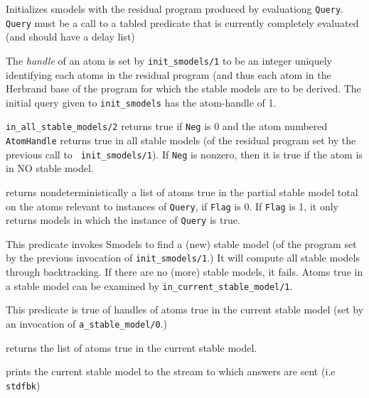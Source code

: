 \begin{description}
%
Initializes smodels with the residual program produced by evaluationg
{\tt Query}.  {\tt Query} must be a call to a tabled predicate that is
currently completely evaluated (and should have a delay list)

% 
The {\em handle} of an atom is set by {\tt init\_smodels/1} to be an
integer uniquely identifying each atoms in the residual program (and
thus each atom in the Herbrand base of the program for which the
stable models are to be derived.  The initial query given to
{\tt init\_smodels} has the atom-handle of 1.

%
{\tt in\_all\_stable\_models/2} returns true if {\tt Neg} is 0 and the
atom numbered {\tt AtomHandle} returns true in all stable models (of
the residual program set by the previous call to {\tt
  init\_smodels/1}).  If {\tt Neg} is nonzero, then it is true if the
atom is in NO stable model.

%
returns nondeterministically a list of atoms true in the partial
stable model total on the atoms relevant to instances of {\tt Query},
if {\tt Flag} is 0.  If {\tt Flag} is 1, it only returns models in
which the instance of {\tt Query} is true.

%
This predicate invokes Smodels to find a (new) stable model (of the
program set by the previous invocation of {\tt init\_smodels/1}.)  It
will compute all stable models through backtracking.  If there are no
(more) stable models, it fails.  Atoms true in a stable model can be
examined by {\tt in\_current\_stable\_model/1}.

%
This predicate is true of handles of atoms true in the current stable
model (set by an invocation of {\tt a\_stable\_model/0}.)

%
returns the list of atoms true in the current stable model.

%
prints the current stable model to the stream to which answers are
sent (i.e {\tt stdfbk})

\end{description}
